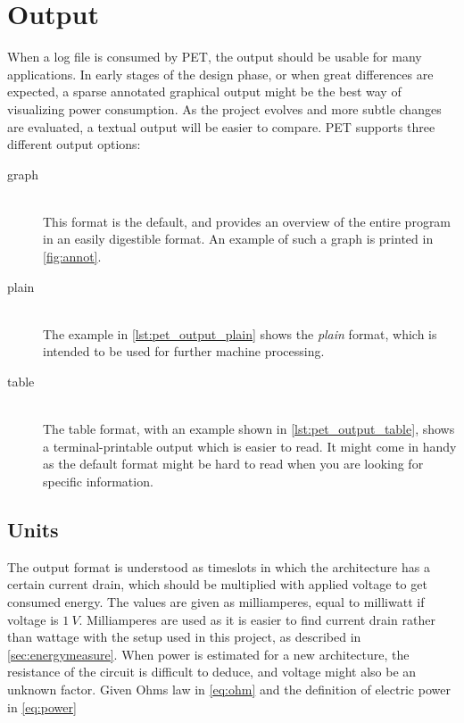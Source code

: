 \section{Output}
\label{sec:output}

When a log file is consumed by PET, the output should be usable for many
applications. In early stages of the design phase, or when great differences are
expected, a sparse annotated graphical output might be the best way of
visualizing power consumption. As the project evolves and more subtle changes
are evaluated, a textual output will be easier to compare. PET supports three
different output options:

\begin{description}
    \item[graph]\hfill\\
        This format is the default, and provides an overview of
        the entire program in an easily digestible format. An example of such
        a graph is printed in \autoref{fig:annot}.
    \item[plain]\hfill\\
        The example in \autoref{lst:pet_output_plain} shows the \emph{plain}
        format, which is intended to be used for further machine processing.
    \item[table]\hfill\\
        The table format, with an example shown in
        \autoref{lst:pet_output_table}, shows a terminal-printable output which
        is easier to read. It might come in handy as the default format might be
        hard to read when you are looking for specific information.
\end{description}

\subsection{Units}

The output format is understood as timeslots in which the architecture has a
certain current drain, which should be multiplied with applied voltage to get
consumed energy. The values are given as milliamperes, equal to milliwatt if
voltage is $1~V$. Milliamperes are used as it is easier to find current drain
rather than wattage with the setup used in this project, as described in
\autoref{sec:energymeasure}. When power is estimated for a new architecture, the
resistance of the circuit is difficult to deduce, and voltage might also be an
unknown factor. Given Ohms law in \autoref{eq:ohm} and the definition of
electric power in \autoref{eq:power}

